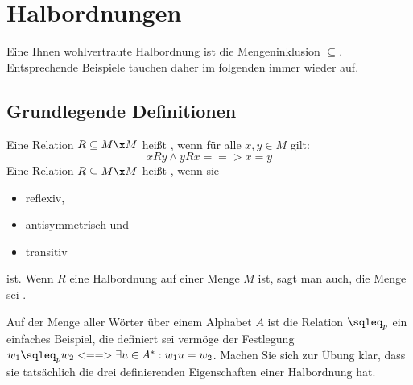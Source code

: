  
\Tut\section{Halbordnungen}
\label{sub:halbord-rel}

Eine Ihnen wohlvertraute Halbordnung ist die Mengeninklusion
$\subseteq$. Entsprechende Beispiele tauchen daher im folgenden immer
wieder auf.

\Tut\subsection{Grundlegende Definitionen}
\label{subsub:halb-ord-def}

Eine Relation $R\subseteq M\x M$ heißt
, wenn für alle $x,y\in M$
gilt:
\[
x R y \land y R x ==> x=y
\]
Eine Relation $R\subseteq M\x M$ heißt
, wenn sie
\begin{itemize}
\item reflexiv,
\item antisymmetrisch und
\item transitiv
\end{itemize}
ist.  Wenn $R$ eine Halbordnung auf einer Menge $M$ ist, sagt man
auch, die Menge sei .

Auf der Menge aller Wörter über einem Alphabet $A$ ist die Relation
$\sqleq_p$ ein einfaches Beispiel, die definiert sei vermöge der
Festlegung $w_1\sqleq_p w_2 <==> \exists u\in A^*: w_1u=w_2$. Machen
Sie sich zur Übung klar, dass sie tatsächlich die drei definierenden
Eigenschaften einer Halbordnung hat.

